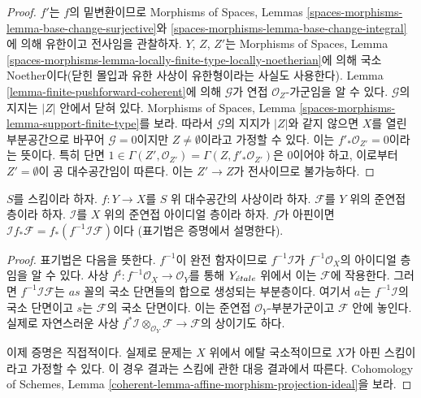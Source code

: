 \begin{proof}
$f'$는 $f$의 밑변환이므로 Morphisms of Spaces, Lemmas
\ref{spaces-morphisms-lemma-base-change-surjective}와
\ref{spaces-morphisms-lemma-base-change-integral}에 의해 유한이고
전사임을 관찰하자. $Y$, $Z$, $Z'$는 Morphisms of Spaces, Lemma
\ref{spaces-morphisms-lemma-locally-finite-type-locally-noetherian}에 의해
국소 Noether이다(닫힌 몰입과 유한 사상이 유한형이라는 사실도
사용한다). Lemma \ref{lemma-finite-pushforward-coherent}에 의해
$\mathcal{G}$가 연접 $\mathcal{O}_Z$-가군임을 알 수 있다.
$\mathcal{G}$의 지지는 $|Z|$ 안에서 닫혀 있다. Morphisms of Spaces,
Lemma \ref{spaces-morphisms-lemma-support-finite-type}를 보라. 따라서
$\mathcal{G}$의 지지가 $|Z|$와 같지 않으면 $X$를 열린 부분공간으로
바꾸어 $\mathcal{G} = 0$이지만 $Z \not = \emptyset$이라고 가정할 수
있다. 이는 $f'_*\mathcal{O}_{Z'} = 0$이라는 뜻이다. 특히 단면
$1 \in \Gamma(Z', \mathcal{O}_{Z'}) =
\Gamma(Z, f'_*\mathcal{O}_{Z'})$은 0이어야 하고, 이로부터
$Z' = \emptyset$이 공 대수공간임이 따른다. 이는 $Z' \to Z$가
전사이므로 불가능하다.
\end{proof}

\begin{lemma}
\label{lemma-affine-morphism-projection-ideal}
$S$를 스킴이라 하자. $f : Y \to X$를 $S$ 위 대수공간의 사상이라 하자.
$\mathcal{F}$를 $Y$ 위의 준연접층이라 하자. $\mathcal{I}$를 $X$ 위의
준연접 아이디얼 층이라 하자. $f$가 아핀이면
$\mathcal{I}f_*\mathcal{F} = f_*(f^{-1}\mathcal{I}\mathcal{F})$이다
(표기법은 증명에서 설명한다).
\end{lemma}

\begin{proof}
표기법은 다음을 뜻한다. $f^{-1}$이 완전 함자이므로
$f^{-1}\mathcal{I}$가 $f^{-1}\mathcal{O}_X$의 아이디얼 층임을 알 수
있다. 사상 $f^\sharp : f^{-1}\mathcal{O}_X \to \mathcal{O}_Y$를 통해
$Y_{\acute{e}tale}$ 위에서 이는
$\mathcal{F}$에 작용한다. 그러면
$f^{-1}\mathcal{I}\mathcal{F}$는 $as$ 꼴의 국소 단면들의 합으로
생성되는 부분층이다. 여기서 $a$는 $f^{-1}\mathcal{I}$의 국소 단면이고
$s$는 $\mathcal{F}$의 국소 단면이다. 이는 준연접
$\mathcal{O}_Y$-부분가군이고 $\mathcal{F}$ 안에 놓인다. 실제로 자연스러운 사상
$f^*\mathcal{I} \otimes_{\mathcal{O}_Y} \mathcal{F} \to \mathcal{F}$의
상이기도 하다.

\medskip\noindent
이제 증명은 직접적이다. 실제로 문제는 $X$ 위에서 에탈 국소적이므로
$X$가 아핀 스킴이라고 가정할 수 있다. 이 경우 결과는 스킴에 관한
대응 결과에서 따른다. Cohomology of Schemes, Lemma
\ref{coherent-lemma-affine-morphism-projection-ideal}을 보라.
\end{proof}

